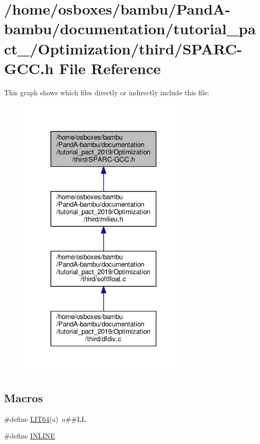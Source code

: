 \hypertarget{tutorial__pact__2019_2Optimization_2third_2SPARC-GCC_8h}{}\section{/home/osboxes/bambu/\+Pand\+A-\/bambu/documentation/tutorial\+\_\+pact\+\_/\+Optimization/third/\+S\+P\+A\+R\+C-\/\+G\+CC.h File Reference}
\label{tutorial__pact__2019_2Optimization_2third_2SPARC-GCC_8h}
This graph shows which files directly or indirectly include this file\+:
\nopagebreak
\begin{figure}[H]
\begin{center}
\leavevmode
\includegraphics[width=237pt]{db/d97/tutorial__pact__2019_2Optimization_2third_2SPARC-GCC_8h__dep__incl}
\end{center}
\end{figure}
\subsection*{Macros}
\begin{DoxyCompactItemize}
\item 
\#define \hyperlink{tutorial__pact__2019_2Optimization_2third_2SPARC-GCC_8h_a575f5a619c8e7d71c338c70a2b4e25a5}{L\+I\+T64}(a)~a\#\#LL
\item 
\#define \hyperlink{tutorial__pact__2019_2Optimization_2third_2SPARC-GCC_8h_a2eb6f9e0395b47b8d5e3eeae4fe0c116}{I\+N\+L\+I\+NE}
\end{DoxyCompactItemize}

